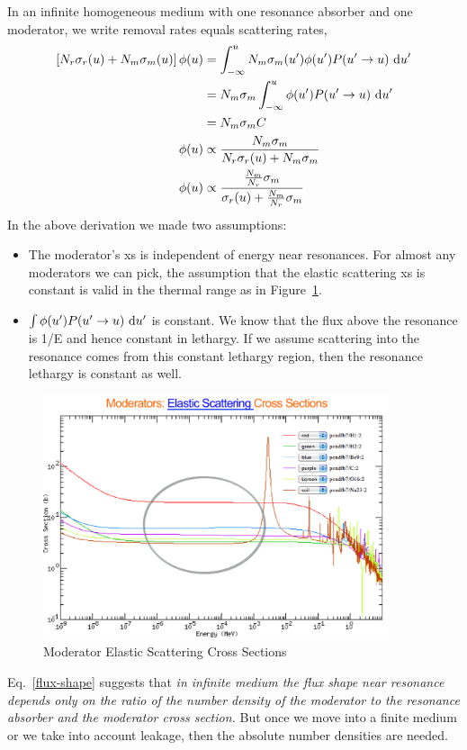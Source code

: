 \documentclass{school-22.211-notes}
\date{February 29, 2012}
\begin{document}
\maketitle

In an infinite homogeneous medium with one resonance absorber and one moderator,  we write removal rates equals scattering rates, 
\begin{align}
\left[ N_r \sigma_r (u) + N_m \sigma_m (u) \right] \phi (u) &= \int_{-\infty}^u N_m \sigma_m (u') \phi(u') P(u' \to u) \mbox{ }\mathrm{d} u' \\ 
&= N_m \sigma_m \int_{-\infty}^u \phi(u') P(u' \to u) \mbox{ }\mathrm{d} u' \\
&= N_m \sigma_m C \\
\phi(u) &\propto \frac{N_m \sigma_m}{N_r \sigma_r(u) + N_m \sigma_m} \\
\phi(u) &\propto \frac{ \frac{N_m}{N_r} \sigma_m}{\sigma_r(u) + \frac{N_m}{N_r} \sigma_m}  \label{flux-shape}
\end{align}
In the above derivation we made two assumptions:
\begin{itemize}
\item The moderator's xs is independent of energy near resonances. For almost any moderators we can pick, the assumption that the elastic scattering xs is constant is valid in the thermal range as in Figure~\ref{moderator-sigma-s}. 
\item $\int \phi(u') P(u' \to u) \mbox{ }\mathrm{d} u'$ is constant. We know that the flux above the resonance is 1/E and hence constant in lethargy. If we assume scattering into the resonance comes from this constant lethargy region, then the resonance lethargy is constant as well. 
\end{itemize}
\begin{figure}
  \centering
  \includegraphics[width=4in]{images/moderator-sigma-s.png}
  \caption{Moderator Elastic Scattering Cross Sections} \label{moderator-sigma-s}
\end{figure}
Eq.~\ref{flux-shape} suggests that \textit{in infinite medium the flux shape near resonance depends only on the ratio of the number density of the moderator to the resonance absorber and the moderator cross section.} But once we move into a finite medium or we take into account leakage, then the absolute number densities are needed.
 
\end{document}
